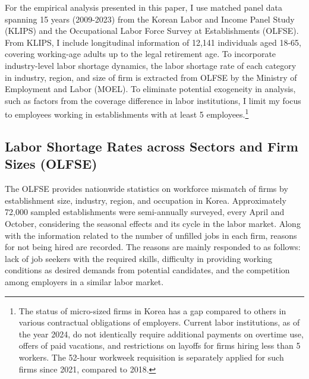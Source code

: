 \documentclass[
  12pt,
]{article}
\begin{document}
For the empirical analysis presented in this paper, I use matched panel
data spanning 15 years (2009-2023) from the Korean Labor and Income
Panel Study (KLIPS) and the Occupational Labor Force Survey at
Establishments (OLFSE). From KLIPS, I include longitudinal information
of 12,141 individuals aged 18-65, covering working-age adults up to the
legal retirement age. To incorporate industry-level labor shortage
dynamics, the labor shortage rate of each category in industry, region,
and size of firm is extracted from OLFSE by the Ministry of Employment
and Labor (MOEL). To eliminate potential exogeneity in analysis, such as
factors from the coverage difference in labor institutions, I limit my
focus to employees working in establishments with at least 5
employees.\footnote{The status of micro-sized firms in Korea has a gap
  compared to others in various contractual obligations of employers.
  Current labor institutions, as of the year 2024, do not identically
  require additional payments on overtime use, offers of paid vacations,
  and restrictions on layoffs for firms hiring less than 5 workers. The
  52-hour workweek requisition is separately applied for such firms
  since 2021, compared to 2018.}

\subsection{Labor Shortage Rates across Sectors and Firm Sizes
(OLFSE)}\label{labor-shortage-rates-across-sectors-and-firm-sizes-olfse}

The OLFSE provides nationwide statistics on workforce mismatch of firms
by establishment size, industry, region, and occupation in Korea.
Approximately 72,000 sampled establishments were semi-annually surveyed,
every April and October, considering the seasonal effects and its cycle
in the labor market. Along with the information related to the number of
unfilled jobs in each firm, reasons for not being hired are recorded.
The reasons are mainly responded to as follows: lack of job seekers with
the required skills, difficulty in providing working conditions as
desired demands from potential candidates, and the competition among
employers in a similar labor market.

\begingroup\fontsize{11}{13}\selectfont
\end{document}
